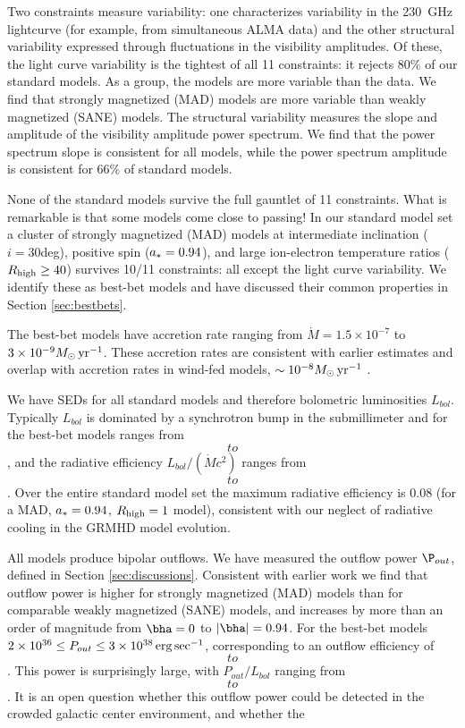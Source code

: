 Two constraints measure variability: one characterizes variability in the 230~GHz lightcurve (for example, from simultaneous ALMA data) and the other structural variability expressed through fluctuations in the visibility amplitudes.  Of these, the light curve variability is the tightest of all 11 constraints: it rejects $80\%$ of our standard models.  As a group, the models are more variable than the data.  We find that strongly magnetized (MAD) models are more variable than weakly magnetized (SANE) models.  The structural variability measures the slope and amplitude of the visibility amplitude power spectrum.  We find that the power spectrum slope is consistent for all models, while the power spectrum amplitude is consistent for 66\% of standard models. 

None of the standard models survive the full gauntlet of 11 constraints.  What is remarkable is that some models come close to passing!  In our standard model set a cluster of strongly magnetized (MAD) models at intermediate inclination ($i = 30$deg), positive spin ($a_* = 0.94$), and large  ion-electron temperature ratios ($R_\mathrm{high} \ge 40$) survives 10/11 constraints: all except the light curve variability.  We identify these as best-bet models and have discussed their common properties in Section \ref{sec:bestbets}.

The best-bet models have accretion rate ranging from $\dot{M} = 1.5 \times 10^{-7}$ to $3 \times 10^{-9} M_\odot \,\mathrm{yr}^{-1}$.  These accretion rates are consistent with earlier estimates and overlap with accretion rates in wind-fed models, $\sim 10^{-8} M_\odot\,\mathrm{yr}^{-1}$ \citep{2020ApJ...896L...6R}.  

We have SEDs for all standard models and therefore bolometric luminosities $L_{bol}$.  Typically $L_{bol}$ is dominated by a synchrotron bump in the submillimeter and for the best-bet models ranges from $$ to $$, and the radiative  efficiency $L_{bol}/(\dot{M} c^2)$ ranges from $$ to $$.  Over the entire standard model set the maximum radiative efficiency is $0.08$ (for a MAD, $a_* = 0.94$, $R_\mathrm{high} = 1$ model), consistent with our neglect of radiative cooling in the GRMHD model evolution.  

All models produce bipolar outflows.  We have measured the outflow power $\P_{out}$, defined in Section \ref{sec:discussions}. Consistent with earlier work we find that outflow power is higher for strongly magnetized (MAD) models than for comparable weakly magnetized (SANE) models, and increases by more than an order of magnitude from $\bha = 0$ to $|\bha| = 0.94$.  For the best-bet models $2 \times 10^{36} \le P_{out} \le 3 \times 10^{38} \,\mathrm{erg} \,\mathrm{sec}^{-1}$, corresponding to an outflow efficiency of $$ to $$.  This power is surprisingly large, with $P_{out}/L_{bol}$ ranging from $$ to $$.  It is an open question whether this outflow power could be detected in the crowded galactic center environment, and whether the 

